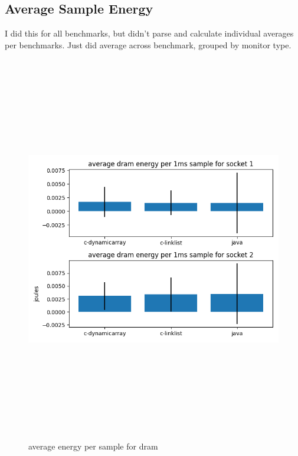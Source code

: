 \subsection{Average Sample Energy}
I did this for all benchmarks, but didn't parse and calculate individual averages per benchmarks. Just did average across benchmark, grouped by monitor type.
    \begin{figure}[H]
    	\centering
    	\includegraphics[width=17cm,height=17cm,keepaspectratio]{AsyncMonitorCompares/time-energy-persample/dram_average_joules_per-sample.png}
    	\caption{average energy per sample for dram}
   	\label{fig:xalan-PKG-Time-scatter}
    \end{figure}
